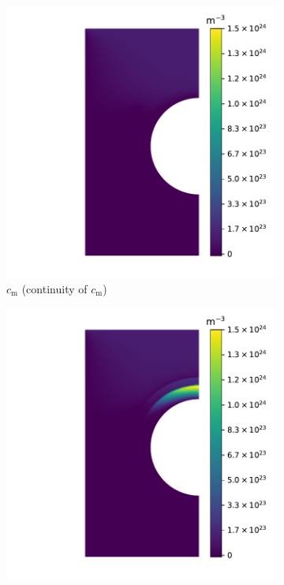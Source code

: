 \begin{figure} [p]
    \centering
    \begin{subfigure}{0.35\linewidth}
        \centering
        \includegraphics[width=\linewidth]{Figures/Chapter3/monoblocks/interface_condition/iter case/solute_c.pdf}
        \caption{$c_\mathrm{m}$ (continuity of $c_\mathrm{m}$)}
    \end{subfigure}%
    \begin{subfigure}{0.35\linewidth}
        \centering
        \includegraphics[width=\linewidth]{Figures/Chapter3/monoblocks/interface_condition/iter case/solute_mu.pdf}

\end{subfigure}
\end{figure}
